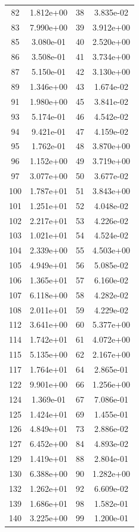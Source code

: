 \documentclass[12pt]{article}
\begin{document}
\begin{longtable}{@{}cccc@{}}
82 & 1.812e+00 & 38 & 3.835e-02 \\
83 & 7.990e+00 & 39 & 3.912e+00 \\
85 & 3.080e-01 & 40 & 2.520e+00 \\
86 & 3.508e-01 & 41 & 3.734e+00 \\
87 & 5.150e-01 & 42 & 3.130e+00 \\
89 & 1.346e+00 & 43 & 1.674e-02 \\
91 & 1.980e+00 & 45 & 3.841e-02 \\
93 & 5.174e-01 & 46 & 4.542e-02 \\
94 & 9.421e-01 & 47 & 4.159e-02 \\
95 & 1.762e-01 & 48 & 3.870e+00 \\
96 & 1.152e+00 & 49 & 3.719e+00 \\
97 & 3.077e+00 & 50 & 3.677e-02 \\
100 & 1.787e+01 & 51 & 3.843e+00 \\
101 & 1.251e+01 & 52 & 4.048e-02 \\
102 & 2.217e+01 & 53 & 4.226e-02 \\
103 & 1.021e+01 & 54 & 4.524e-02 \\
104 & 2.339e+00 & 55 & 4.503e+00 \\
105 & 4.949e+01 & 56 & 5.085e-02 \\
106 & 1.365e+01 & 57 & 6.160e-02 \\
107 & 6.118e+00 & 58 & 4.282e-02 \\
108 & 2.011e+01 & 59 & 4.229e-02 \\
112 & 3.641e+00 & 60 & 5.377e+00 \\
114 & 1.742e+01 & 61 & 4.072e+00 \\
115 & 5.135e+00 & 62 & 2.167e+00 \\
117 & 1.764e+01 & 64 & 2.865e-01 \\
122 & 9.901e+00 & 66 & 1.256e+00 \\
124 & 1.369e-01 & 67 & 7.086e-01 \\
125 & 1.424e+01 & 69 & 1.455e-01 \\
126 & 4.849e+01 & 73 & 2.886e-02 \\
127 & 6.452e+00 & 84 & 4.893e-02 \\
129 & 1.419e+01 & 88 & 2.804e-01 \\
130 & 6.388e+00 & 90 & 1.282e+00 \\
132 & 1.262e+01 & 92 & 6.609e-02 \\
139 & 1.686e+01 & 98 & 1.582e-01 \\
140 & 3.225e+00 & 99 & 1.200e-01 \\

\end{longtable}
\end{document}
